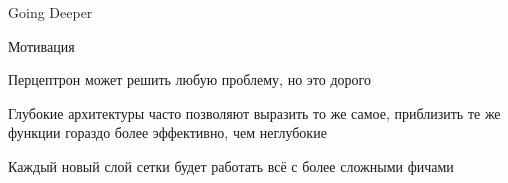 \documentclass[notes,12pt, aspectratio=169]{beamer}
\newenvironment{wideitemize}{\itemize\addtolength{\itemsep}{10pt}}{\enditemize}
\begin{document}
{
\begin{frame}[fragile]
\vspace{6.5cm}
\begin{center}
{\color{white} \Huge{Going Deeper}}
\end{center}
\end{frame}
}

\begin{frame}{Мотивация}
\begin{wideitemize}
	\item Перцептрон может решить любую проблему, но это дорого
	
	\item Глубокие архитектуры часто позволяют выразить то же самое, приблизить те же функции гораздо более эффективно, чем неглубокие
	
	\item Каждый новый слой сетки будет работать всё с более сложными фичами
\end{wideitemize}

\end{frame}


{
	\begin{frame}
	
\end{frame}
}
\end{document}
